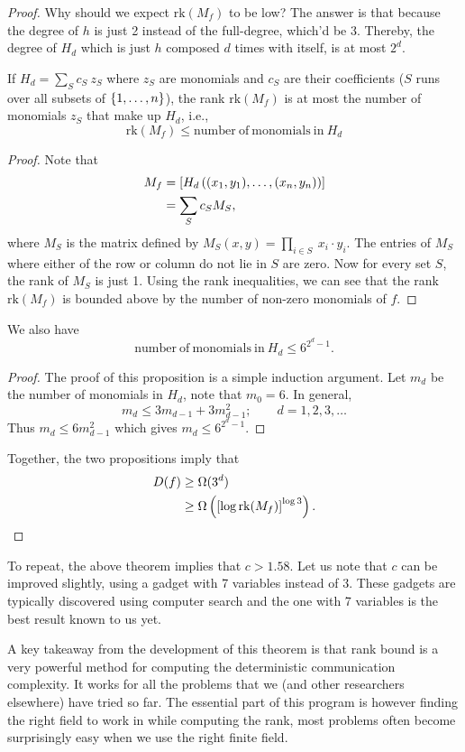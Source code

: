 \documentclass[letterpaper]{article}
\providecommand\rbrac[1]{\ensuremath \left(#1\right)}
\providecommand\sqbrac[1]{\ensuremath \left[#1\right]}
\providecommand\cbrac[1]{\ensuremath \left\{#1\right\}}
\newcommand{\rk}{\mathrm{rk}}
\newcommand{\mf}{M_f}
\newcommand{\df}{D(f)}
\begin{document}
\begin{proof}
Why should we expect $\rk (\mf)$ to be low? The answer is that because the degree of $h$ is just 2 instead of the full-degree, which'd be 3. Thereby, the degree of $H_d$ which is just $h$ composed $d$ times with itself, is at most $2^d$.

\begin{proposition}
If $H_d = \sum_S c_S\ z_S$ where $z_S$ are monomials and $c_S$ are their coefficients ($S$ runs over all subsets of $\cbrac{1, \ldots, n}$), the rank $\rk (\mf)$ is at most the number of monomials $z_S$ that make up $H_d$, i.e.,
$$
\rk (\mf) \leq \mathrm{number\ of\ monomials\ in}\ H_d
$$
\end{proposition}
\begin{proof}
Note that
\begin{align*}
    \mf &= \sqbrac{H_d \rbrac{(x_1, y_1), \ldots, (x_n, y_n)}}\\
    &= \sum_S c_S M_S,
\end{align*}
where $M_S$ is the matrix defined by $M_S(x,y) = \prod_{i \in S}\ x_i \cdot y_i$. The entries of $M_S$ where either of the row or column do not lie in $S$ are zero. Now for every set $S$, the rank of $M_S$ is just 1. Using the rank inequalities, we can see that the rank $\rk (\mf)$ is bounded above by the number of non-zero monomials of $f$.
\end{proof}

\begin{proposition}
We also have 
$$
\mathrm{number\ of\ monomials\ in}\ H_d \leq 6^{2^d -1}.
$$
\end{proposition}
\begin{proof}
The proof of this proposition is a simple induction argument. Let $m_d$ be the number of monomials in $H_d$, note that $m_0 = 6$. In general,
$$
m_d \leq 3 m_{d-1} + 3 m_{d-1}^2; \qquad d = 1, 2, 3, \ldots
$$
Thus $m_d \leq 6 m_{d-1}^2$ which gives $m_d \leq 6^{2^d - 1}$.
\end{proof}

Together, the two propositions imply that
\begin{align*}
\df &\geq \Omega(3^d)\\
& \geq \Omega \rbrac{\sqbrac{\log \rk (\mf)}^{\log 3} }.
\end{align*}
\end{proof}

\begin{remark}
To repeat, the above theorem implies that $c > 1.58$. Let us note that $c$ can be improved slightly, using a gadget with 7 variables instead of 3. These gadgets are typically discovered using computer search and the one with 7 variables is the best result known to us yet.

A key takeaway from the development of this theorem is that rank bound is a very powerful method for computing the deterministic communication complexity. It works for all the problems that we (and other researchers elsewhere) have tried so far. The essential part of this program is however finding the right field to work in while computing the rank, most problems often become surprisingly easy when we use the right finite field.
\end{remark}
\end{document}

